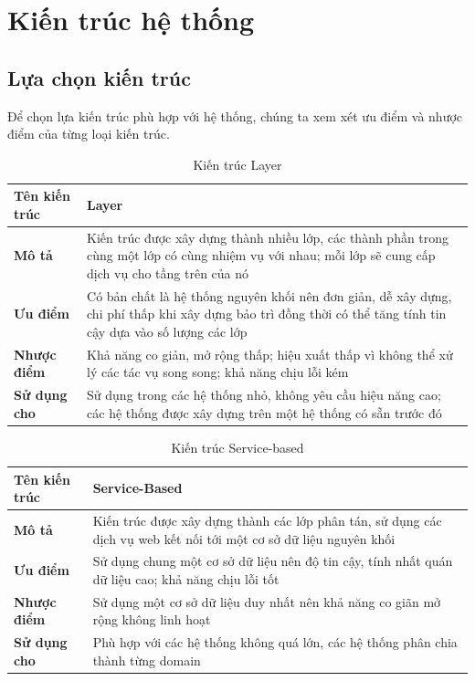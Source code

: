 
\section{Kiến trúc hệ thống}
\subsection{Lựa chọn kiến trúc}
 
\hspace*{0.5cm}Để chọn lựa kiến trúc phù hợp với hệ thống, chúng ta xem xét ưu điểm và nhược điểm của từng loại kiến trúc.\\
 
\begin{table}[h]
    \begin{tabular}{|p{3cm}|p{12cm}|}
        \hline
        \textbf{Tên kiến trúc} & Layer\\
        \hline
        \textbf{Mô tả}         & Kiến trúc được xây dựng thành nhiều lớp, các thành phần trong cùng một lớp có cùng nhiệm vụ với nhau; mỗi lớp sẽ cung cấp dịch vụ cho tầng trên của nó \\
        \hline
        \textbf{Ưu điểm}       & Có bản chất là hệ thống nguyên khối nên đơn giản, dễ xây dựng, chi phí thấp khi xây dựng bảo trì đồng thời có thể tăng tính tin cậy dựa vào số lượng các lớp \\
        \hline
        \textbf{Nhược điểm}    & Khả năng co giản, mở rộng thấp; hiệu xuất thấp vì không thể xử lý các tác vụ song song; khả năng chịu lỗi kém\\
        \hline
        \textbf{Sử dụng cho}   & Sử dụng trong các hệ thống nhỏ, không yêu cầu hiệu năng cao; các hệ thống được xây dựng trên một hệ thống có sẵn trước đó \\
        \hline
    \end{tabular}
    \caption{Kiến trúc Layer}
\end{table}
 
\begin{table}[h]
    \begin{tabular}{|p{3cm}|p{12cm}|}
        \hline
        \textbf{Tên kiến trúc} & Service-Based\\
        \hline
        \textbf{Mô tả}         & Kiến trúc được xây dựng thành các lớp phân tán, sử dụng các dịch vụ web kết nối tới một cơ sở dữ liệu nguyên khối     \\
        \hline
        \textbf{Ưu điểm}       & Sử dụng chung một cơ sở dữ liệu nên độ tin cậy, tính nhất quán dữ liệu cao; khả năng chịu lỗi tốt \\
        \hline
        \textbf{Nhược điểm}    & Sử dụng một cơ sở dữ liệu duy nhất nên khả năng co giãn mở rộng không linh hoạt   \\
        \hline
        \textbf{Sử dụng cho}   & Phù hợp với các hệ thống không quá lớn, các hệ thống phân chia thành từng domain                   \\
        \hline
    \end{tabular}
    \caption{Kiến trúc Service-based}
\end{table}
 
